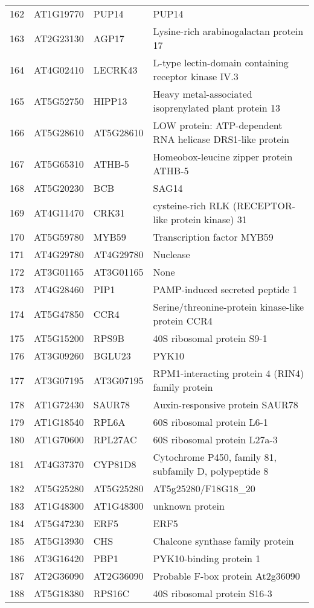 \documentclass[a4paper]{article}
\begin{document}
\begin{center}
\begin{tabular}{rlll}
162 & AT1G19770 & PUP14 & PUP14\\
163 & AT2G23130 & AGP17 & Lysine-rich arabinogalactan protein 17\\
164 & AT4G02410 & LECRK43 & L-type lectin-domain containing receptor kinase IV.3\\
165 & AT5G52750 & HIPP13 & Heavy metal-associated isoprenylated plant protein 13\\
166 & AT5G28610 & AT5G28610 & LOW protein: ATP-dependent RNA helicase DRS1-like protein\\
167 & AT5G65310 & ATHB-5 & Homeobox-leucine zipper protein ATHB-5\\
168 & AT5G20230 & BCB & SAG14\\
169 & AT4G11470 & CRK31 & cysteine-rich RLK (RECEPTOR-like protein kinase) 31\\
170 & AT5G59780 & MYB59 & Transcription factor MYB59\\
171 & AT4G29780 & AT4G29780 & Nuclease\\
172 & AT3G01165 & AT3G01165 & None\\
173 & AT4G28460 & PIP1 & PAMP-induced secreted peptide 1\\
174 & AT5G47850 & CCR4 & Serine/threonine-protein kinase-like protein CCR4\\
175 & AT5G15200 & RPS9B & 40S ribosomal protein S9-1\\
176 & AT3G09260 & BGLU23 & PYK10\\
177 & AT3G07195 & AT3G07195 & RPM1-interacting protein 4 (RIN4) family protein\\
178 & AT1G72430 & SAUR78 & Auxin-responsive protein SAUR78\\
179 & AT1G18540 & RPL6A & 60S ribosomal protein L6-1\\
180 & AT1G70600 & RPL27AC & 60S ribosomal protein L27a-3\\
181 & AT4G37370 & CYP81D8 & Cytochrome P450, family 81, subfamily D, polypeptide 8\\
182 & AT5G25280 & AT5G25280 & AT5g25280/F18G18\_20\\
183 & AT1G48300 & AT1G48300 & unknown protein\\
184 & AT5G47230 & ERF5 & ERF5\\
185 & AT5G13930 & CHS & Chalcone synthase family protein\\
186 & AT3G16420 & PBP1 & PYK10-binding protein 1\\
187 & AT2G36090 & AT2G36090 & Probable F-box protein At2g36090\\
188 & AT5G18380 & RPS16C & 40S ribosomal protein S16-3\\

\end{tabular}
\end{center}
\end{document}
